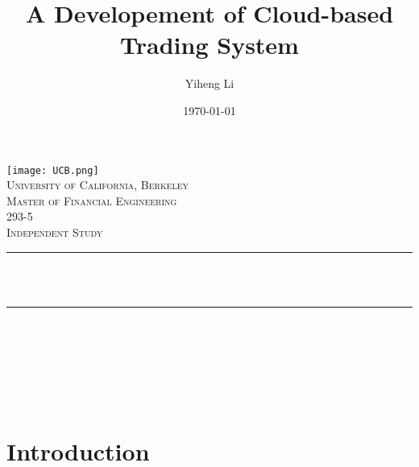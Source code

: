 \documentclass[12pt]{article}
\title{A Developement of Cloud-based Trading System}								%
\author{Yiheng Li}								%
\date{\today}											%
\makeatletter
\let\thetitle\@title
\let\theauthor\@author
\let\thedate\@date
\makeatother
\begin{document}

\begin{titlepage}
	\centering
    \vspace*{0.5 cm}
    \texttt{[image: UCB.png]}\\[1.0 cm]	%
    \textsc{\LARGE University of California, Berkeley}\\
    \textsc{\Large Master of Financial Engineering}\\[2.0 cm]	%
	\textsc{\Large 293-5}\\[0.5 cm]				%
	\textsc{\large Independent Study}\\[0.5 cm]				%
	\rule{\linewidth}{0.2 mm} \\[0.5 cm]
	{ \huge \bfseries \thetitle}\\
	\rule{\linewidth}{0.2 mm} \\[2 cm]
	
	\begin{minipage}{0.2\textwidth}
		\begin{center} \large
			\theauthor
			\end{center}
			\end{minipage}~
			\begin{minipage}{0.4\textwidth}
	\end{minipage}\\[1 cm]
	
	{\large \thedate}\\[1 cm]
 
	\vfill
	
\end{titlepage}


\tableofcontents
\pagebreak


\section{Introduction}
\end{document}
